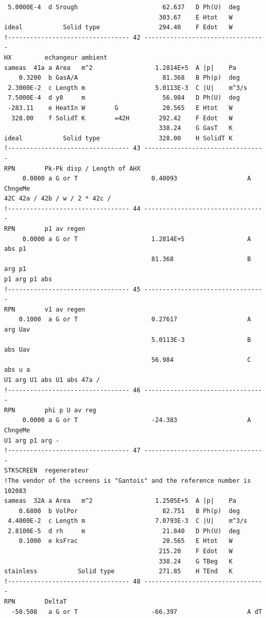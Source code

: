 \begin{linenumbers}
\begin{verbatim}
 5.0000E-4  d Srough                       62.637   D Ph(U)  deg
                                          303.67    E Htot   W
ideal           Solid type                294.40    F Edot   W
!--------------------------------- 42 ---------------------------------
HX         echangeur ambient
sameas  41a a Area   m^2                 1.2814E+5  A |p|    Pa
    0.3200  b GasA/A                       81.368   B Ph(p)  deg
 2.3000E-2  c Length m                   5.0113E-3  C |U|    m^3/s
 7.5000E-4  d y0     m                     56.984   D Ph(U)  deg
 -283.11    e HeatIn W        G            20.565   E Htot   W
  328.00    f SolidT K        =42H        292.42    F Edot   W
                                          338.24    G GasT   K
ideal           Solid type                328.00    H SolidT K
!--------------------------------- 43 ---------------------------------
RPN        Pk-Pk disp / Length of AHX
     0.0000 a G or T                    0.40093                   A ChngeMe
42C 42a / 42b / w / 2 * 42c /
!--------------------------------- 44 ---------------------------------
RPN        p1 av regen
     0.0000 a G or T                    1.2814E+5                 A abs p1
                                        81.368                    B arg p1
p1 arg p1 abs
!--------------------------------- 45 ---------------------------------
RPN        v1 av regen
    0.1000  a G or T                    0.27617                   A arg Uav
                                        5.0113E-3                 B abs Uav
                                        56.984                    C abs u a
U1 arg U1 abs U1 abs 47a /
!--------------------------------- 46 ---------------------------------
RPN        phi p U av reg
     0.0000 a G or T                    -24.383                   A ChngeMe
U1 arg p1 arg -
!--------------------------------- 47 ---------------------------------
STKSCREEN  regenerateur
!The vendor of the screens is "Gantois" and the reference number is 102083
sameas  32A a Area   m^2                 1.2505E+5  A |p|    Pa
    0.6800  b VolPor                       82.751   B Ph(p)  deg
 4.4000E-2  c Length m                   7.0793E-3  C |U|    m^3/s
 2.8100E-5  d rh     m                     21.840   D Ph(U)  deg
    0.1000  e ksFrac                       20.565   E Htot   W
                                          215.20    F Edot   W
                                          338.24    G TBeg   K
stainless           Solid type            271.85    H TEnd   K
!--------------------------------- 48 ---------------------------------
RPN        DeltaT
  -50.508   a G or T                    -66.397                   A dT

\end{verbatim}
\end{linenumbers}
